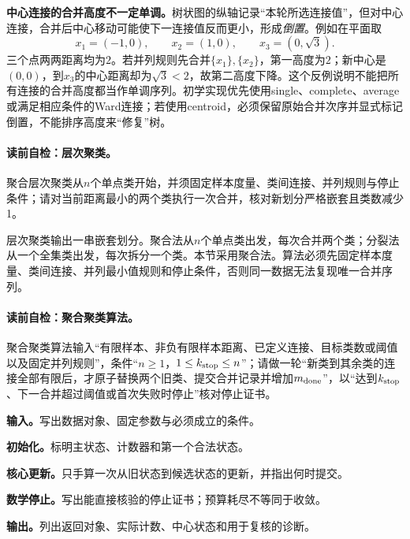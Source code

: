 \begin{warningbox}
\textbf{中心连接的合并高度不一定单调。}树状图的纵轴记录“本轮所选连接值”，但对中心连接，合并后中心移动可能使下一连接值反而更小，形成\emph{倒置}。例如在平面取
\[
x_1=(-1,0),\qquad x_2=(1,0),\qquad x_3=(0,\sqrt3).
\]
三个点两两距离均为$2$。若并列规则先合并$\{x_1\},\{x_2\}$，第一高度为$2$；新中心是$(0,0)$，到$x_3$的中心距离却为$\sqrt3<2$，故第二高度下降。这个反例说明不能把所有连接的合并高度都当作单调序列。初学实现优先使用single、complete、average或满足相应条件的Ward连接；若使用centroid，必须保留原始合并次序并显式标记倒置，不能排序高度来“修复”树。
\end{warningbox}

\paragraph{读前自检：层次聚类。}聚合层次聚类从$n$个单点类开始，并须固定样本度量、类间连接、并列规则与停止条件；请对当前距离最小的两个类执行一次合并，核对新划分严格嵌套且类数减少1。\par

层次聚类输出一串嵌套划分。聚合法从$n$个单点类出发，每次合并两个类；分裂法从一个全集类出发，每次拆分一个类。本节采用聚合法。算法必须先固定样本度量、类间连接、并列最小值规则和停止条件，否则同一数据无法复现唯一合并序列。


\paragraph{读前自检：聚合聚类算法。}聚合聚类算法输入“有限样本、非负有限样本距离、已定义连接、目标类数或阈值以及固定并列规则”，条件“$n\ge1$，$1\le k_{\rm stop}\le n$”；请做一轮“新类到其余类的连接全部有限后，才原子替换两个旧类、提交合并记录并增加$m_{\rm done}$”，以“达到$k_{\rm stop}$、下一合并超过阈值或首次失败时停止”核对停止证书。\par

\begin{keypointbox}[title={聚合层次聚类：五步阅读}]
\textbf{输入。}写出数据对象、固定参数与必须成立的条件。\par
\textbf{初始化。}标明主状态、计数器和第一个合法状态。\par
\textbf{核心更新。}只手算一次从旧状态到候选状态的更新，并指出何时提交。\par
\textbf{数学停止。}写出能直接核验的停止证书；预算耗尽不等同于收敛。\par
\textbf{输出。}列出返回对象、实际计数、中心状态和用于复核的诊断。
\end{keypointbox}
